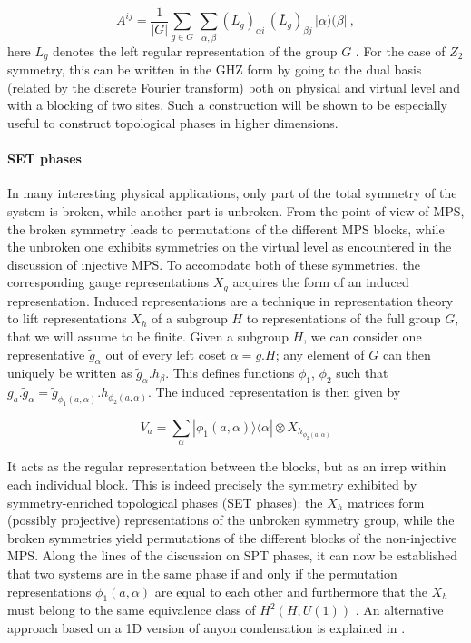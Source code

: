 \documentclass[rmp,aps,reprint,superscriptaddress,nobalancelastpage]{revtex4-1}
\newcommand{\be}{\begin{equation}}
\newcommand{\ee}{\end{equation}}
\begin{document}
\be
\label{GinjMPS}
A^{ij}=\frac{1}{|G|}\sum_{g\in G}\, \sum_{\alpha, \beta}\left(L_g\right)_{\alpha i}\,\left(\bar{L}_g\right)_{\beta j} \, |\alpha)(\beta|\ ,
\ee
here $L_g$ denotes the left regular representation of the group $G$ \cite{schuch:peps-sym}. For the case of $Z_2$ symmetry, this can be written in the GHZ form by going to the dual basis (related by the discrete Fourier transform) both on physical and virtual level and with a blocking of two sites. Such a construction will be shown to be especially useful to construct topological phases in higher dimensions.


\paragraph{SET phases}
In many interesting physical applications, only part of the total symmetry of the system is broken, while another part is unbroken. From the point of view of MPS, the broken symmetry leads to permutations of the different MPS blocks, while the unbroken one exhibits symmetries on the virtual level as encountered in the discussion of injective MPS. To accomodate both of these symmetries, the corresponding gauge representations $X_g$  acquires  the form of an induced representation. Induced representations are a technique in representation theory to lift representations $X_h$ of  a subgroup $H$ to representations of the full group $G$, that we will assume to be finite. Given a subgroup $H$, we can consider one representative $\tilde{g}_\alpha$ out of every left coset $\alpha=g.H$; any element of $G$ can then uniquely be written as $\tilde{g}_\alpha.h_\beta$. This defines functions $\phi_1$, $\phi_2$ such that  $g_a.\tilde{g}_\alpha=\tilde{g}_{\phi_1(a,\alpha)}.h_{\phi_2(a,\alpha)}$. The induced representation is then given by

\[V_a=\sum_{\alpha}|\phi_1(a,\alpha)\rangle\langle \alpha|\otimes X_{h_{\phi_2(a,\alpha)}}\]

It acts as the regular representation between the blocks, but as an irrep within each individual block. This is indeed precisely the symmetry exhibited by symmetry-enriched topological phases (SET phases): the $X_h$ matrices form (possibly projective) representations of the unbroken symmetry group, while the broken symmetries yield permutations of the different blocks of the non-injective MPS. Along the lines of the discussion on SPT phases, it can now be established that two systems are in the same phase if and only if the permutation representations $\phi_1(a,\alpha)$ are equal to each other and furthermore that the $X_h$ must belong to the same equivalence class of $H^2(H,U(1))$ \cite{schuch:mps-phases}. An alternative approach based on a 1D version of anyon condensation is explained in \citet{garre2017symmetry}.
\end{document}
